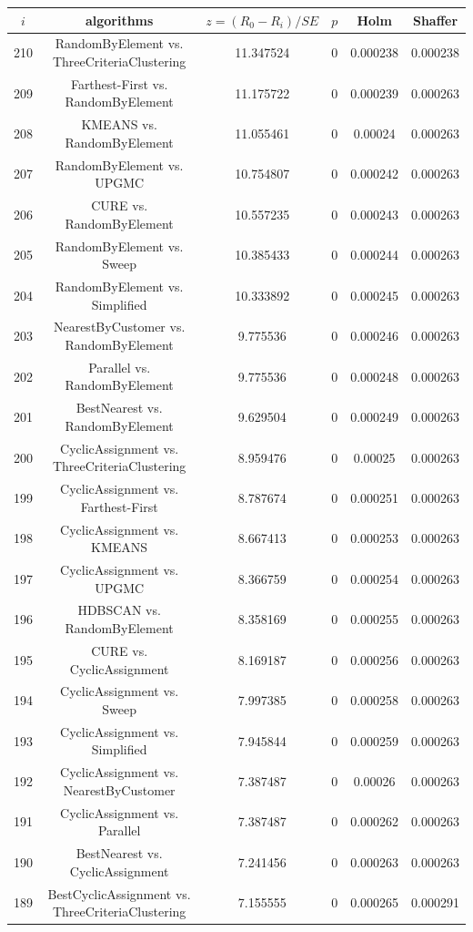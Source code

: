 \documentclass[a4paper,10pt]{article}
\begin{document}
\begin{landscape}
\begin{table}[!htp]
\centering\scriptsize
\begin{tabular}{cccccc}
$i$&algorithms&$z=(R_0 - R_i)/SE$&$p$&Holm&Shaffer\\
\hline210&RandomByElement vs. ThreeCriteriaClustering&11.347524&0&0.000238&0.000238\\
209&Farthest-First vs. RandomByElement&11.175722&0&0.000239&0.000263\\
208&KMEANS vs. RandomByElement&11.055461&0&0.00024&0.000263\\
207&RandomByElement vs. UPGMC&10.754807&0&0.000242&0.000263\\
206&CURE vs. RandomByElement&10.557235&0&0.000243&0.000263\\
205&RandomByElement vs. Sweep&10.385433&0&0.000244&0.000263\\
204&RandomByElement vs. Simplified&10.333892&0&0.000245&0.000263\\
203&NearestByCustomer vs. RandomByElement&9.775536&0&0.000246&0.000263\\
202&Parallel vs. RandomByElement&9.775536&0&0.000248&0.000263\\
201&BestNearest vs. RandomByElement&9.629504&0&0.000249&0.000263\\
200&CyclicAssignment vs. ThreeCriteriaClustering&8.959476&0&0.00025&0.000263\\
199&CyclicAssignment vs. Farthest-First&8.787674&0&0.000251&0.000263\\
198&CyclicAssignment vs. KMEANS&8.667413&0&0.000253&0.000263\\
197&CyclicAssignment vs. UPGMC&8.366759&0&0.000254&0.000263\\
196&HDBSCAN vs. RandomByElement&8.358169&0&0.000255&0.000263\\
195&CURE vs. CyclicAssignment&8.169187&0&0.000256&0.000263\\
194&CyclicAssignment vs. Sweep&7.997385&0&0.000258&0.000263\\
193&CyclicAssignment vs. Simplified&7.945844&0&0.000259&0.000263\\
192&CyclicAssignment vs. NearestByCustomer&7.387487&0&0.00026&0.000263\\
191&CyclicAssignment vs. Parallel&7.387487&0&0.000262&0.000263\\
190&BestNearest vs. CyclicAssignment&7.241456&0&0.000263&0.000263\\
189&BestCyclicAssignment vs. ThreeCriteriaClustering&7.155555&0&0.000265&0.000291\\

\end{tabular}
\end{table}
\end{landscape}
\end{document}
